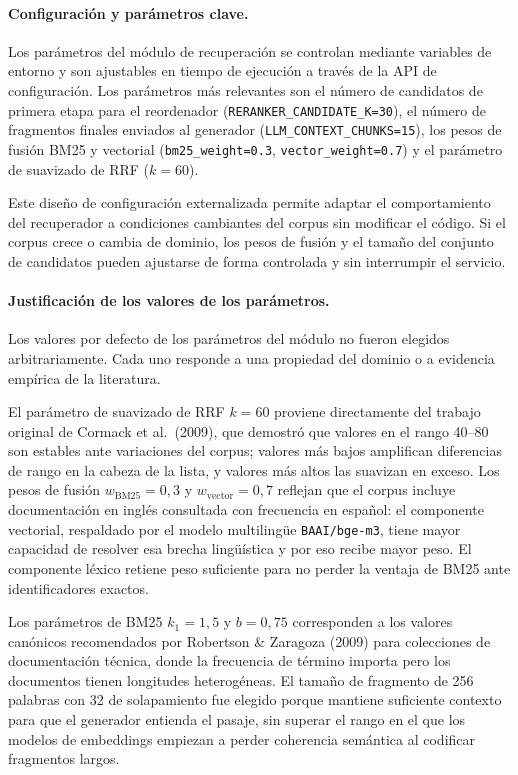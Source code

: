 \documentclass[11pt]{article}
\begin{document}
\paragraph{Configuración y parámetros clave.}
Los parámetros del módulo de recuperación se controlan mediante variables de entorno y son
ajustables en tiempo de ejecución a través de la API de configuración. Los parámetros más
relevantes son el número de candidatos de primera etapa para el reordenador
(\texttt{RERANKER\_CANDIDATE\_K=30}), el número de fragmentos finales enviados al generador
(\texttt{LLM\_CONTEXT\_CHUNKS=15}), los pesos de fusión BM25 y vectorial
(\texttt{bm25\_weight=0.3}, \texttt{vector\_weight=0.7}) y el parámetro de suavizado de RRF
($k=60$).

Este diseño de configuración externalizada permite adaptar el comportamiento del recuperador a
condiciones cambiantes del corpus sin modificar el código. Si el corpus crece o cambia de
dominio, los pesos de fusión y el tamaño del conjunto de candidatos pueden ajustarse de forma
controlada y sin interrumpir el servicio.

\paragraph{Justificación de los valores de los parámetros.}
Los valores por defecto de los parámetros del módulo no fueron elegidos arbitrariamente. Cada
uno responde a una propiedad del dominio o a evidencia empírica de la literatura.

El parámetro de suavizado de RRF $k=60$ proviene directamente del trabajo original de Cormack
et al.\ (2009), que demostró que valores en el rango 40--80 son estables ante variaciones del
corpus; valores más bajos amplifican diferencias de rango en la cabeza de la lista, y valores
más altos las suavizan en exceso. Los pesos de fusión $w_{\text{BM25}}=0{,}3$ y
$w_{\text{vector}}=0{,}7$ reflejan que el corpus incluye documentación en inglés consultada
con frecuencia en español: el componente vectorial, respaldado por el modelo multilingüe
\texttt{BAAI/bge-m3}, tiene mayor capacidad de resolver esa brecha lingüística y por eso
recibe mayor peso. El componente léxico retiene peso suficiente para no perder la ventaja de
BM25 ante identificadores exactos.

Los parámetros de BM25 $k_1=1{,}5$ y $b=0{,}75$ corresponden a los valores canónicos
recomendados por Robertson \& Zaragoza (2009) para colecciones de documentación técnica, donde
la frecuencia de término importa pero los documentos tienen longitudes heterogéneas. El tamaño
de fragmento de 256 palabras con 32 de solapamiento fue elegido porque mantiene suficiente
contexto para que el generador entienda el pasaje, sin superar el rango en el que los modelos
de embeddings empiezan a perder coherencia semántica al codificar fragmentos largos.
\end{document}
